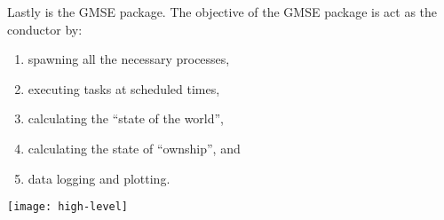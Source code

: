 Lastly is the GMSE package. The objective of the GMSE package is act as the conductor by:

\begin{enumerate}
  \item spawning all the necessary processes,
  \item executing tasks at scheduled times,
  \item calculating the ``state of the world'',
  \item calculating the state of ``ownship'', and
  \item data logging and plotting.
\end{enumerate}

\begin{figure*}
\texttt{[image: high-level]}
\caption{}
\label{fig:high-level}
\end{figure*}
